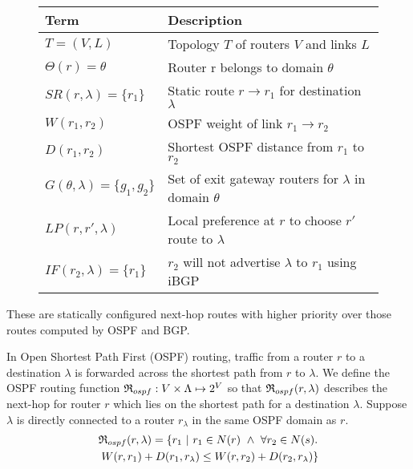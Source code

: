 \begin{figure}
\vspace{-2mm}
\small
\begin{minipage}{\linewidth}
	\begin{tabular}{m{9em}  m{18em} } 
		{\bf Term} & {\bf Description} \\ 
		\hline
		$T=(V,L)$ & Topology $T$ of routers $V$ and links $L$ \\ \hline
		$\Theta(r) = \theta$ & Router r belongs to domain $\theta$ \\ \hline
		$SR(r,\lambda)=\{r_1\}$ & Static route $r \rightarrow r_1$ for destination $\lambda$ \\ \hline
		$W(r_1, r_2)$ & OSPF weight of link $r_1 \rightarrow r_2$ \\ \hline
		$D(r_1, r_2)$ & Shortest OSPF distance from $r_1$ to $r_2$ \\ \hline
		$G(\theta, \lambda) = \{g_1, g_2\}$ & Set of exit gateway routers for $\lambda$ in domain $\theta$ \\ \hline
		$LP(r, r', \lambda)$ &  Local preference at $r$ to choose $r'$ route to $\lambda$ \\ \hline
		$IF(r_2, \lambda) = \{r_1\}$ & $r_2$ will not advertise $\lambda$ to $r_1$ using iBGP 
	\end{tabular}
	\end{minipage}
	\label{tab:zeppelinconfig}
\end{figure}


These are statically configured next-hop routes with higher 
priority over those routes computed by OSPF and BGP.

 In Open Shortest Path First (OSPF) routing,
traffic from a router $r$ to a destination $\lambda$ is forwarded across 
the shortest path from $r$ to $\lambda$.
We define the OSPF routing function $\mathfrak{R}_{ospf}: 
V \times \Lambda \mapsto 2^V$ so that
$\mathfrak{R}_{ospf}(r,\lambda)$ describes the next-hop for
router $r$ which lies on the shortest path for a destination $\lambda$. 
\iffull
Suppose $\lambda$ is directly connected to a router $r_\lambda$ 
in the same OSPF domain as $r$.
\begin{multline*}
\mathfrak{R}_{ospf}(r,\lambda) = \{r_1 ~|~ r_1 \in N(r)~\wedge~ \forall r_2 \in N(s). \\ ~W(r, r_1) + D(r_1, r_\lambda) \le 
W(r, r_2) + D(r_2, r_\lambda)\}
\end{multline*}
\fi

